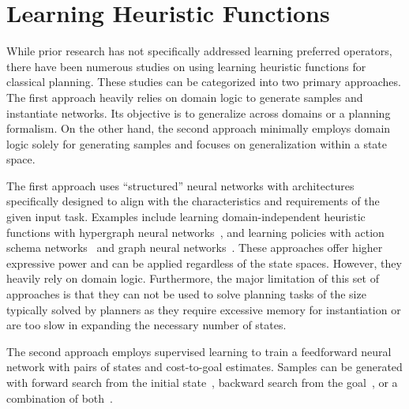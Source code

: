\documentclass[ppgc,diss,english]{iiufrgs}
\begin{document}
\section{Learning Heuristic Functions}
\label{sec:related-h}
While prior research has not specifically addressed learning preferred operators, there have been numerous studies on using learning heuristic functions for classical planning. These studies can be categorized into two primary approaches.
The first approach heavily relies on domain logic to generate samples and instantiate networks. Its objective is to generalize across domains or a planning formalism.
On the other hand, the second approach minimally employs domain logic solely for generating samples and focuses on generalization within a state space.

The first approach uses ``structured'' neural networks with architectures specifically designed to align with the characteristics and requirements of the given input task. Examples include learning domain-independent heuristic functions with hypergraph neural networks~\cite{Shen.etal/2020}, and learning policies with action schema networks~\cite{Toyer.etal/2018,Toyer.etal/2020} and graph neural networks~\cite{Stahlberg.etal/2022}. These approaches offer higher expressive power and can be applied regardless of the state spaces. However, they heavily rely on domain logic. Furthermore, the major limitation of this set of approaches is that they can not be used to solve planning tasks of the size typically solved by planners as they require excessive memory for instantiation or are too slow in expanding the necessary number of states.

The second approach employs supervised learning to train a feedforward neural network with pairs of states and cost-to-goal estimates. Samples can be generated with forward search from the initial state~\cite{Ferber.etal/2020a}, backward search from the goal~\cite{Yu.etal/2020,OToole/2022,Bettker.etal/2022}, or a combination of both~\cite{Ferber.etal/2022}.

\end{document}
